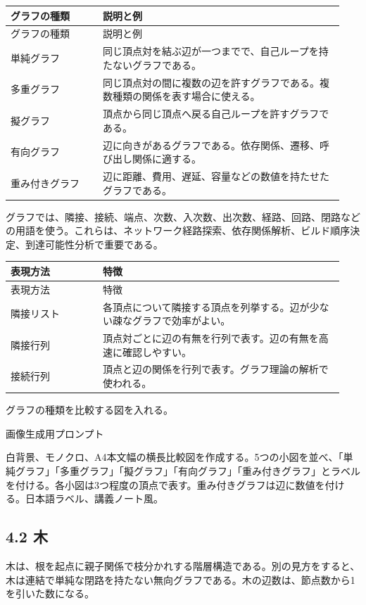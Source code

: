 \documentclass[uplatex,dvipdfmx,a4paper,10pt]{jsarticle}
\begin{document}
\begin{longtable}{>{\raggedright\arraybackslash}p{0.26\linewidth} >{\raggedright\arraybackslash}p{0.68\linewidth}}
\toprule
グラフの種類 & 説明と例 \\
\midrule
\endfirsthead
\toprule
グラフの種類 & 説明と例 \\
\midrule
\endhead
単純グラフ & 同じ頂点対を結ぶ辺が一つまでで、自己ループを持たないグラフである。 \\
多重グラフ & 同じ頂点対の間に複数の辺を許すグラフである。複数種類の関係を表す場合に使える。 \\
擬グラフ & 頂点から同じ頂点へ戻る自己ループを許すグラフである。 \\
有向グラフ & 辺に向きがあるグラフである。依存関係、遷移、呼び出し関係に適する。 \\
重み付きグラフ & 辺に距離、費用、遅延、容量などの数値を持たせたグラフである。 \\
\bottomrule
\end{longtable}
グラフでは、隣接、接続、端点、次数、入次数、出次数、経路、回路、閉路などの用語を使う。これらは、ネットワーク経路探索、依存関係解析、ビルド順序決定、到達可能性分析で重要である。

\begin{longtable}{>{\raggedright\arraybackslash}p{0.26\linewidth} >{\raggedright\arraybackslash}p{0.68\linewidth}}
\toprule
表現方法 & 特徴 \\
\midrule
\endfirsthead
\toprule
表現方法 & 特徴 \\
\midrule
\endhead
隣接リスト & 各頂点について隣接する頂点を列挙する。辺が少ない疎なグラフで効率がよい。 \\
隣接行列 & 頂点対ごとに辺の有無を行列で表す。辺の有無を高速に確認しやすい。 \\
接続行列 & 頂点と辺の関係を行列で表す。グラフ理論の解析で使われる。 \\
\bottomrule
\end{longtable}
\begin{todobox}
グラフの種類を比較する図を入れる。

画像生成用プロンプト

白背景、モノクロ、A4本文幅の横長比較図を作成する。5つの小図を並べ、「単純グラフ」「多重グラフ」「擬グラフ」「有向グラフ」「重み付きグラフ」とラベルを付ける。各小図は3つ程度の頂点で表す。重み付きグラフは辺に数値を付ける。日本語ラベル、講義ノート風。
\end{todobox}
\subsection{4.2 木}
木は、根を起点に親子関係で枝分かれする階層構造である。別の見方をすると、木は連結で単純な閉路を持たない無向グラフである。木の辺数は、節点数から1を引いた数になる。
\end{document}
